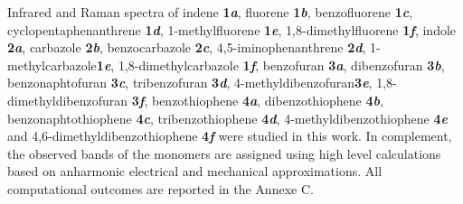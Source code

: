 Infrared and Raman spectra of  indene \textbf{1\textit{a}}, fluorene \textbf{1\textit{b}}, benzofluorene \textbf{1\textit{c}}, cyclopentaphenanthrene \textbf{1\textit{d}}, 1-methylfluorene \textbf{1\textit{e}}, 1,8-dimethylfluorene \textbf{1\textit{f}},
indole \textbf{2\textit{a}}, carbazole \textbf{2\textit{b}}, benzocarbazole \textbf{2\textit{c}}, 4,5-iminophenanthrene \textbf{2\textit{d}}, 1-methylcarbazole\textbf{1\textit{e}}, 1,8-dimethylcarbazole \textbf{1\textit{f}},
benzofuran \textbf{3\textit{a}}, dibenzofuran \textbf{3\textit{b}}, benzonaphtofuran \textbf{3\textit{c}}, tribenzofuran \textbf{3\textit{d}}, 4-methyldibenzofuran\textbf{3\textit{e}}, 1,8-dimethyldibenzofuran \textbf{3\textit{f}},
benzothiophene \textbf{4\textit{a}}, dibenzothiophene \textbf{4\textit{b}}, benzonaphtothiophene \textbf{4\textit{c}}, tribenzothiophene \textbf{4\textit{d}}, 4-methyldibenzothiophene \textbf{4\textit{e}} and 4,6-dimethyldibenzothiophene \textbf{4\textit{f}} were studied in this work. In complement, the observed bands of the monomers are assigned using high level calculations based on anharmonic electrical and mechanical approximations. All computational outcomes are reported in the Annexe C.
	
